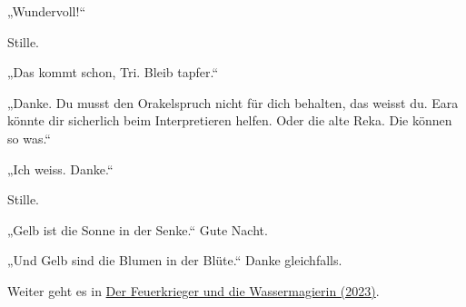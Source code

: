 „Wundervoll!“

Stille.

„Das kommt schon, Tri. Bleib tapfer.“

„Danke. Du musst den Orakelspruch nicht für dich behalten, das weisst du. Eara könnte dir sicherlich beim Interpretieren helfen. Oder die alte Reka. Die können so was.“

„Ich weiss. Danke.“

Stille.

„Gelb ist die Sonne in der Senke.“ Gute Nacht.

„Und Gelb sind die Blumen in der Blüte.“ Danke gleichfalls.

\begin{commentbox}
    Weiter geht es in \hyperref[2023-der-feuerkrieger-und-die-wassermagierin]{Der Feuerkrieger und die Wassermagierin (2023)}.
\end{commentbox}

